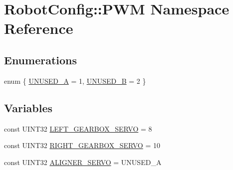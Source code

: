 \hypertarget{namespace_robot_config_1_1_p_w_m}{
\section{\-Robot\-Config\-:\-:\-P\-W\-M \-Namespace \-Reference}
\label{namespace_robot_config_1_1_p_w_m}
}
\subsection*{\-Enumerations}
\begin{DoxyCompactItemize}
\item 
enum \{ \hyperlink{namespace_robot_config_1_1_p_w_m_a92576224f215d2918b9011b33935d13aa3569a4a18ddb5e825b24e6c6db4b6167}{\-U\-N\-U\-S\-E\-D\-\_\-\-A} =  1, 
\hyperlink{namespace_robot_config_1_1_p_w_m_a92576224f215d2918b9011b33935d13aade3dafa7f93013871bbf1d163ac4b768}{\-U\-N\-U\-S\-E\-D\-\_\-\-B} =  2
 \}
\end{DoxyCompactItemize}
\subsection*{\-Variables}
\begin{DoxyCompactItemize}
\item 
const \-U\-I\-N\-T32 \hyperlink{namespace_robot_config_1_1_p_w_m_a1b460ec63fedf424b36f0f0aa3aeb8fd}{\-L\-E\-F\-T\-\_\-\-G\-E\-A\-R\-B\-O\-X\-\_\-\-S\-E\-R\-V\-O} = 8
\item 
const \-U\-I\-N\-T32 \hyperlink{namespace_robot_config_1_1_p_w_m_a2a0fbfee9ec53745c1de2636b08b97d4}{\-R\-I\-G\-H\-T\-\_\-\-G\-E\-A\-R\-B\-O\-X\-\_\-\-S\-E\-R\-V\-O} = 10
\item 
const \-U\-I\-N\-T32 \hyperlink{namespace_robot_config_1_1_p_w_m_a61c6f534b4c0a3c44da059b56b79a6f2}{\-A\-L\-I\-G\-N\-E\-R\-\_\-\-S\-E\-R\-V\-O} = \-U\-N\-U\-S\-E\-D\-\_\-\-A
\end{DoxyCompactItemize}


